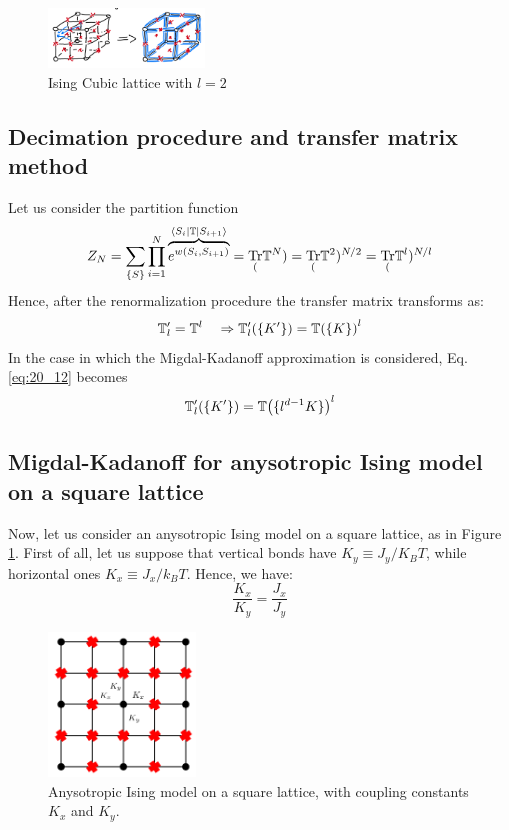 \documentclass[../../Main/Main.tex]{subfiles}
\begin{document}
\begin{figure}[H]
\centering
\includegraphics[width=0.37\textwidth]{./img/IMG1}
\caption{Ising Cubic lattice with \( l=2 \)}
\end{figure}

\subsection{Decimation procedure and transfer matrix method}
Let us consider the partition function
\begin{equation*}
  Z_N = \sum_{\{ S \}  }^{} \prod_{i=1}^{N} \overbrace{e^{w (S_i,S_{i+1})} }^{\bra{S_i} \mathbb{T} \ket{S_{i+1}}  }
  = \underset{(}{\text{Tr}}\mathbb{T}^N) =   \underset{(}{\text{Tr}}\mathbb{T}^2)^{N/2} = \underset{(}{\text{Tr}}\mathbb{T}^l)^{N/l}
\end{equation*}
Hence, after the renormalization procedure the transfer matrix transforms as:
\begin{equation}
  \mathbb{T}_l' = \mathbb{T}^l \quad \Rightarrow   \mathbb{T}_l' \qty( \{ K' \}  )  =   \mathbb{T} \qty(\{ K \}  )^l
  \label{eq:20_12}
\end{equation}
In the case in which the Migdal-Kadanoff approximation is considered, Eq.\eqref{eq:20_12} becomes
\begin{equation}
   \mathbb{T}_l' \qty( \{ K' \}  )  =   \mathbb{T} \qty(\{ l^{d-1} K \}  )^l
\end{equation}



\clearpage

\subsection{Migdal-Kadanoff for anysotropic Ising model on a square lattice}

Now, let us consider an anysotropic Ising model on a square lattice, as in Figure \ref{fig:20_11}. First of all, let us suppose that vertical bonds have \( K_y \equiv J_y/K_B T \), while horizontal ones \( K_x \equiv J_x/k_B T \). Hence, we have:
\begin{equation*}
  \frac{K_x}{K_y} = \frac{J_x}{J_y}
\end{equation*}

\begin{figure}[H]
\centering
\includegraphics[width=0.35\textwidth]{./img/13.pdf}
\caption{\label{fig:20_11} Anysotropic Ising model on a square lattice, with coupling constants \( K_x \) and \( K_y \).}
\end{figure}
\end{document}
